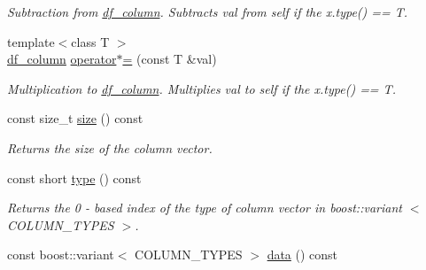 \begin{DoxyCompactItemize}
\begin{DoxyCompactList}\small\item\em Subtraction from \hyperlink{classboost_1_1numeric_1_1ublas_1_1df__column}{df\+\_\+column}. Subtracts val from self if the {\ttfamily x.\+type()} == T. \end{DoxyCompactList}\item 
{\footnotesize template$<$class T $>$ }\\\hyperlink{classboost_1_1numeric_1_1ublas_1_1df__column}{df\+\_\+column} \hyperlink{classboost_1_1numeric_1_1ublas_1_1df__column_a89a456bc73862053d18385ef49b9fd46}{operator$\ast$=} (const T \&val)
\begin{DoxyCompactList}\small\item\em Multiplication to \hyperlink{classboost_1_1numeric_1_1ublas_1_1df__column}{df\+\_\+column}. Multiplies val to self if the {\ttfamily x.\+type()} == T. \end{DoxyCompactList}\item 
const size\+\_\+t \hyperlink{classboost_1_1numeric_1_1ublas_1_1df__column_ae604a0d9f7118a91615df1bcb4a7f823}{size} () const \hypertarget{classboost_1_1numeric_1_1ublas_1_1df__column_ae604a0d9f7118a91615df1bcb4a7f823}{}\label{classboost_1_1numeric_1_1ublas_1_1df__column_ae604a0d9f7118a91615df1bcb4a7f823}

\begin{DoxyCompactList}\small\item\em Returns the size of the column vector. \end{DoxyCompactList}\item 
const short \hyperlink{classboost_1_1numeric_1_1ublas_1_1df__column_a0cc0ab94af87b956eb75ea159ad76ea6}{type} () const \hypertarget{classboost_1_1numeric_1_1ublas_1_1df__column_a0cc0ab94af87b956eb75ea159ad76ea6}{}\label{classboost_1_1numeric_1_1ublas_1_1df__column_a0cc0ab94af87b956eb75ea159ad76ea6}

\begin{DoxyCompactList}\small\item\em Returns the 0 -\/ based index of the type of column vector in boost\+::variant $<$ C\+O\+L\+U\+M\+N\+\_\+\+T\+Y\+P\+ES $>$. \end{DoxyCompactList}\item 
const boost\+::variant$<$ C\+O\+L\+U\+M\+N\+\_\+\+T\+Y\+P\+ES $>$ \hyperlink{classboost_1_1numeric_1_1ublas_1_1df__column_a4affb80868ab80aabf96f0be2fd613c7}{data} () const \hypertarget{classboost_1_1numeric_1_1ublas_1_1df__column_a4affb80868ab80aabf96f0be2fd613c7}{}\label{classboost_1_1numeric_1_1ublas_1_1df__column_a4affb80868ab80aabf96f0be2fd613c7}


\end{DoxyCompactItemize}
